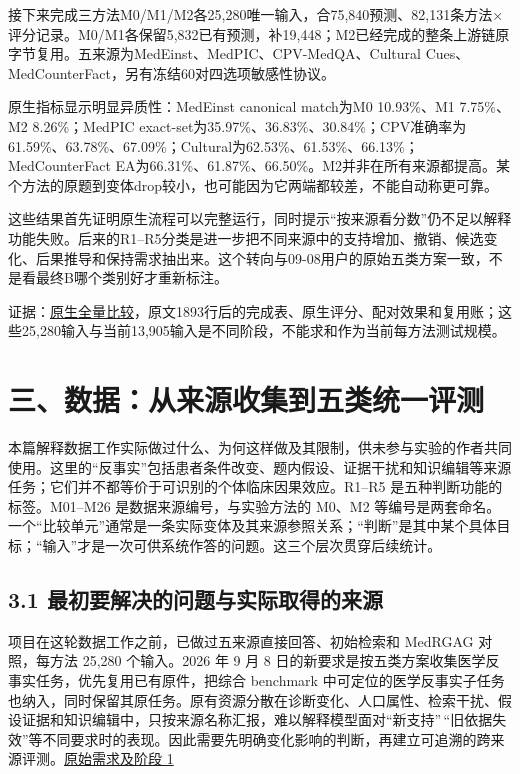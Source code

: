 \documentclass[
  11pt,
  a4paper,
]{article}
\begin{document}
接下来完成三方法M0/M1/M2各25,280唯一输入，合75,840预测、82,131条方法×评分记录。M0/M1各保留5,832已有预测，补19,448；M2已经完成的整条上游链原字节复用。五来源为MedEinst、MedPIC、CPV-MedQA、Cultural
Cues、MedCounterFact，另有冻结60对四选项敏感性协议。

原生指标显示明显异质性：MedEinst canonical match为M0 10.93\%、M1
7.75\%、M2 8.26\%；MedPIC
exact-set为35.97\%、36.83\%、30.84\%；CPV准确率为61.59\%、63.78\%、67.09\%；Cultural为62.53\%、61.53\%、66.13\%；MedCounterFact
EA为66.31\%、61.87\%、66.50\%。M2并非在所有来源都提高。某个方法的原题到变体drop较小，也可能因为它两端都较差，不能自动称更可靠。

这些结果首先证明原生流程可以完整运行，同时提示``按来源看分数''仍不足以解释功能失败。后来的R1--R5分类是进一步把不同来源中的支持增加、撤销、候选变化、后果推导和保持需求抽出来。这个转向与09-08用户的原始五类方案一致，不是看最终B哪个类别好才重新标注。

证据：\href{https://github.com/xiotakut/cf_mrg/blob/main/papers/2026-10-02_cf_moa/author_dossier/records/archive/native_baseline_screening.md}{原生全量比较}，原文1893行后的完成表、原生评分、配对效果和复用账；这些25,280输入与当前13,905输入是不同阶段，不能求和作为当前每方法测试规模。

\label{data-construction}

\section{三、数据：从来源收集到五类统一评测}\label{ux4e09ux6570ux636eux4eceux6765ux6e90ux6536ux96c6ux5230ux4e94ux7c7bux7edfux4e00ux8bc4ux6d4b}

本篇解释数据工作实际做过什么、为何这样做及其限制，供未参与实验的作者共同使用。这里的``反事实''包括患者条件改变、题内假设、证据干扰和知识编辑等来源任务；它们并不都等价于可识别的个体临床因果效应。R1--R5
是五种判断功能的标签。M01--M26 是数据来源编号，与实验方法的 M0、M2
等编号是两套命名。一个``比较单元''通常是一条实际变体及其来源参照关系；``判断''是其中某个具体目标；``输入''才是一次可供系统作答的问题。这三个层次贯穿后续统计。

\subsection{3.1
最初要解决的问题与实际取得的来源}\label{ux6700ux521dux8981ux89e3ux51b3ux7684ux95eeux9898ux4e0eux5b9eux9645ux53d6ux5f97ux7684ux6765ux6e90}

项目在这轮数据工作之前，已做过五来源直接回答、初始检索和 MedRGAG
对照，每方法 25,280 个输入。2026 年 9 月 8
日的新要求是按五类方案收集医学反事实任务，优先复用已有原件，把综合
benchmark
中可定位的医学反事实子任务也纳入，同时保留其原任务。原有资源分散在诊断变化、人口属性、检索干扰、假设证据和知识编辑中，只按来源名称汇报，难以解释模型面对``新支持''\,``旧依据失效''等不同要求时的表现。因此需要先明确变化影响的判断，再建立可追溯的跨来源评测。\href{https://github.com/xiotakut/cf_mrg/blob/main/papers/2026-10-02_cf_moa/author_dossier/records/data/construction.md\#L1810}{原始需求及阶段
1}
\end{document}

